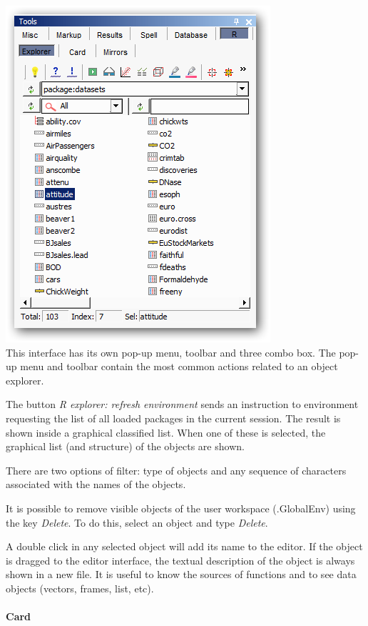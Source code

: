 \includegraphics[scale=0.50]{./res/tools_r_explorer.png} \\

This interface has its own pop-up menu, toolbar and three combo box.
The pop-up menu and toolbar contain the most common actions related to an object explorer.

The button \textit{R explorer: refresh environment} sends an instruction to
\RR{} environment requesting the list of all loaded packages in the current
session. The result is shown inside a graphical classified list. When one
of these is selected, the graphical list (and structure) of the objects
are shown.

There are two options of filter: type of objects and any sequence of
characters associated with the names of the objects.

It is possible to remove visible objects of the user workspace (.GlobalEnv)
using the key \textit{Delete}. To do this, select an object and type
\textit{Delete}.

A double click in any selected object will add its name to the editor.
If the object is dragged to the editor interface, the textual description
of the object is always shown in a new file. It is useful to know the
sources of functions and to see data objects (vectors, frames, list, etc).

\newpage
\paragraph{}\textbf{Card}\\

